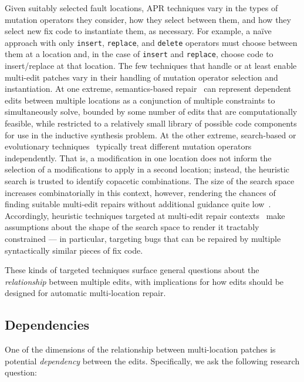 \documentclass[sigconf, timestamp-false, anonymous=true]{acmart}
\begin{document}
Given suitably selected fault locations, APR techniques vary in the types of
mutation operators they consider, how they select between them, and how they
select new fix code to instantiate them, as necessary.  For example, a na{\"i}ve
approach with only \texttt{insert}, \texttt{replace}, and \texttt{delete}
operators must choose between them at a location and, in the case of
\texttt{insert} and \texttt{replace}, choose code to insert/replace at that
location.  
%
The few techniques that handle or at least enable multi-edit patches vary in their
handling of mutation operator selection and instantiation.  At one
extreme, semantics-based repair~\cite{s3,angelix} can represent dependent edits between multiple
locations as a conjunction of multiple constraints to simultaneously solve,
bounded by some number of edits that are computationally feasible, while
restricted to a relatively small library of possible code components for use in
the inductive synthesis problem.    At the other extreme, search-based or
evolutionary techniques~\cite{genprog,par} typically treat different mutation
operators independently.  That is, a modification in one location does not
inform the selection of a modifications to apply in a second location; instead,
the heuristic search is trusted to identify copacetic combinations.  The size of
the search space increases combinatorially in this context, however, rendering
the chances of finding suitable multi-edit repairs without additional guidance
quite low~\cite{ae,long-search-spaces}. Accordingly, heuristic techniques targeted at multi-edit
repair contexts~\cite{saha2019harnessing} make assumptions about the
shape of the search space to render it tractably constrained --- in particular,
targeting bugs that can be repaired by multiple syntactically similar pieces of
fix code.

These kinds of targeted techniques surface general questions about the
\emph{relationship} between multiple edits, with implications for how edits
should be designed for automatic multi-location repair. 

\subsection{Dependencies}

One of the dimensions of the relationship between multi-location patches is potential
\emph{dependency} between the edits. Specifically, we ask the following research question:
\end{document}
